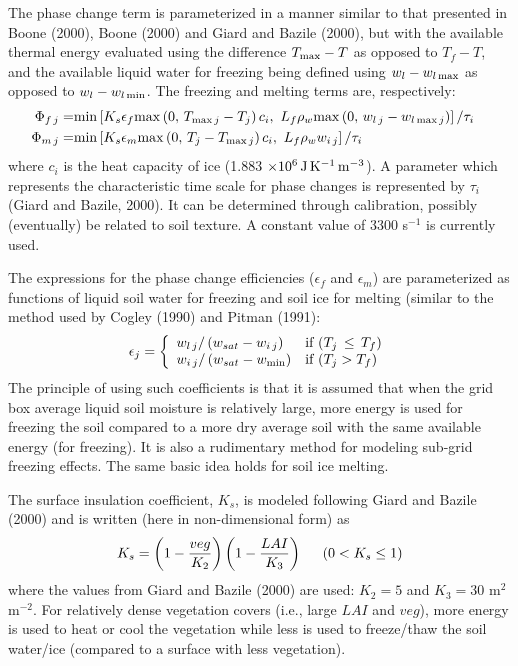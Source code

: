 The phase change term is parameterized in a manner similar to that presented
in Boone (2000), Boone \etal (2000) and Giard and Bazile (2000),
but with the available thermal energy
evaluated using the difference $T_{\rm max} - T$ as opposed
to $T_f - T$, and the available liquid water for freezing being
defined using $w_l - w_{l\,{\rm max}}$ as opposed to
$w_l - w_{l\,{\rm min}}$. The freezing and melting terms
are, respectively:
%
\begin{eqnarray}
\Phi_{f\,j} = & {\rm min}
\left[
K_s \epsilon_f {\rm max}
\left( 0,\, T_{{\rm max}\,j}-T_j\right) c_i, \,\,
L_f \rho_w 
{\rm max}\left(0,\, w_{l\,j}-w_{l\,{\rm max}\,j}\right)
\right] /\tau_i
\cr
\Phi_{m\,j} = & {\rm min}
\left[K_s \epsilon_m {\rm max}
\left( 0,\, T_j-T_{{\rm max}\,j}\right) c_i, \,\,
L_f \rho_w w_{i\,j} \right]/\tau_i
\cr
\end{eqnarray}
%
where $c_i$ is the heat capacity of ice 
(1.883 ${\rm \times {10}^6 \,J\, K^{-1}\,m^{-3}}$).
A parameter which represents the characteristic time
scale for phase changes is represented by $\tau_i$
(Giard and Bazile, 2000). It
can be determined through calibration,
possibly (eventually) be related to soil texture.
A constant value of 3300 s$^{-1}$ is currently used.

The expressions for the phase change efficiencies ($\epsilon_f$ and $\epsilon_m$) 
are parameterized as functions of
liquid soil water for freezing and soil ice for
melting (similar to the method
used by Cogley \etal (1990)\nocite{Cogley1990} and Pitman \etal (1991)\nocite{Pitman1991}:
%
%
\[ \epsilon_j = \left\{ \begin{array}{ll}
    w_{l\,j} /\left(w_{sat}-w_{i\,j}\right)
& \mbox{if $\left(T_j \,\leq\, T_f\right)$}
\\
w_{i\,j}/\left(w_{sat}-w_{\rm min}\right)
& \mbox{if $\left(T_j > T_f\right)$}
\end{array} 
\right. \] 
%
%
The principle of using such coefficients is that 
it is assumed that when the grid box average liquid
soil moisture is relatively large, more energy is used
for freezing the soil compared to a more dry average soil
with the same available energy (for freezing). 
It is also a rudimentary method for modeling sub-grid freezing effects.
The same basic idea holds for soil ice melting.

The surface insulation
coefficient, $K_s$, is modeled following Giard and Bazile (2000) and
is written (here in non-dimensional form) as
%
\begin{equation}
K_s = \left(1 - {veg\over K_2}\right)
\left(1 - {LAI\over K_3}\right)
\hskip.2in
\left(0 < K_s \leq 1 \right)
\end{equation}
%
%
where the values from Giard and Bazile (2000) are used:
$K_2 = 5$ and $K_3 = 30$ m$^2$ m$^{-2}$.
%
For relatively dense vegetation covers (i.e., large $LAI$ and $veg$),
more energy is used to heat or cool the vegetation while less
is used to freeze/thaw the soil water/ice (compared to a surface
with less vegetation).

